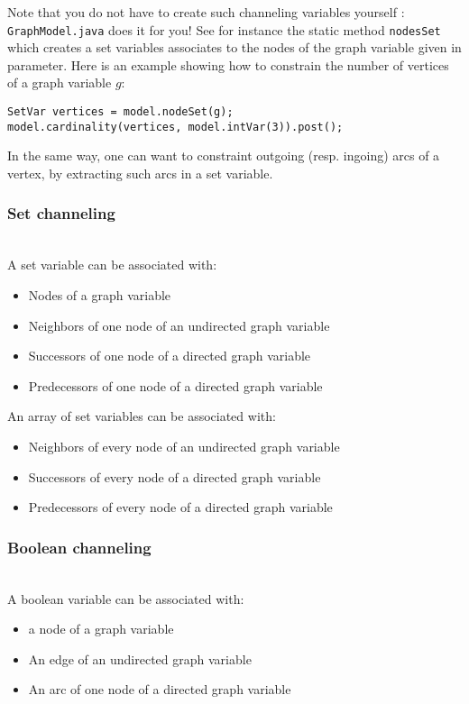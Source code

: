 \documentclass{article}
\begin{document}
Note that you do not have to create such channeling variables yourself : \texttt{GraphModel.java} does it for you! 
See for instance the static method \texttt{nodesSet} which creates a set variables associates to the nodes of the graph variable given in parameter. 
Here is an example showing how to constrain the number of vertices of a graph variable $g$: 

\begin{lstlisting}
SetVar vertices = model.nodeSet(g);
model.cardinality(vertices, model.intVar(3)).post();
\end{lstlisting}

In the same way, one can want to constraint outgoing (resp. ingoing) arcs of a vertex, by extracting such arcs in a set variable. 

\subsubsection{Set channeling}~\\

A set variable can be associated with: 
\begin{itemize}
\item Nodes of a graph variable
\item Neighbors of one node of an undirected graph variable
\item Successors of one node of a directed graph variable
\item Predecessors of one node of a directed graph variable
\end{itemize}

An array of set variables can be associated with: 
\begin{itemize}
\item Neighbors of every node of an undirected graph variable
\item Successors of every node of a directed graph variable
\item Predecessors of every node of a directed graph variable
\end{itemize}

\subsubsection{Boolean channeling}~\\

A boolean variable can be associated with: 
\begin{itemize}
\item a node of a graph variable
\item An edge of an undirected graph variable
\item An arc of one node of a directed graph variable
\end{itemize}
\end{document}
